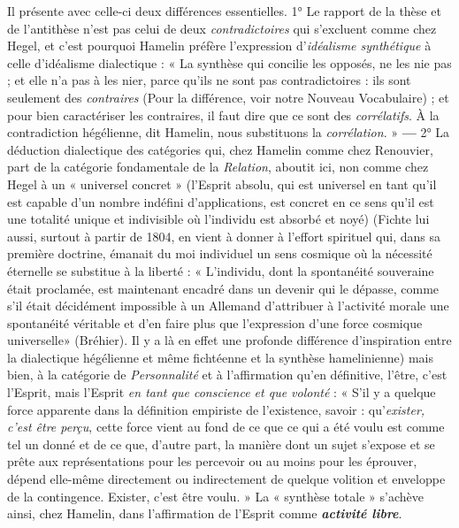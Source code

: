 Il présente avec celle-ci deux différences essentielles. 1° Le rapport de
la thèse et de l’antithèse n’est pas celui de deux {\it contradictoires} qui s’excluent
comme chez Hegel, et c’est pourquoi Hamelin préfère l’expression d'\textsf{\textit {idéalisme
synthétique}} à celle d’idéalisme dialectique : « La synthèse qui concilie
les opposés, ne les nie pas ; et elle n’a pas à les nier, parce qu’ils ne sont pas
contradictoires : ils sont seulement des {\it contraires} {\scriptsize (Pour la différence, voir notre Nouveau Vocabulaire)} ; et pour bien caractériser
les contraires, il faut dire que ce sont des {\it corrélatifs}. À la contradiction
hégélienne, dit Hamelin, nous substituons la {\it corrélation}. » {\bf —} 2° La déduction
dialectique des catégories qui, chez Hamelin comme chez Renouvier,
part de la catégorie fondamentale de la {\it Relation}, aboutit ici, non comme
chez Hegel à un « universel concret » (l'Esprit absolu, qui est universel en
tant qu’il est capable d’un nombre indéfini d'applications, est concret en
ce sens qu'il est une totalité unique et indivisible où l’individu est absorbé
et noyé)
{\scriptsize (Fichte lui aussi, surtout à partir de 1804, en vient à donner à l'effort spirituel qui,
dans sa première doctrine, émanait du moi individuel un sens cosmique où la nécessité
éternelle se substitue à la liberté : « L'individu, dont la spontanéité souveraine était
proclamée, est maintenant encadré dans un devenir qui le dépasse, comme s'il était
décidément impossible à un Allemand d’attribuer à l’activité morale une spontanéité
véritable et d'en faire plus que l'expression d’une force cosmique universelle» (Bréhier).
Il y a là en effet une profonde différence d'inspiration entre la dialectique hégélienne et
même fichtéenne et la synthèse hamelinienne)}
mais bien, à la catégorie de {\it Personnalité} et à l'affirmation qu’en
définitive, l'être, c’est l'Esprit, mais l'Esprit {\it en tant que conscience et que
volonté} : « S'il y a quelque force apparente dans la définition empiriste de
l'existence, savoir : qu’{\it exister, c’est être perçu}, cette force vient au fond de
ce que ce qui a été voulu est comme tel un donné et de ce que, d'autre
part, la manière dont un sujet s'expose et se prête aux représentations pour
les percevoir ou au moins pour les éprouver, dépend elle-même directement
ou indirectement de quelque volition et enveloppe de la contingence.
Exister, c’est être voulu. »
La « synthèse totale » s’achève ainsi, chez Hamelin, dans l’affirmation
de l'Esprit comme \textbf{\textit {activité libre}}.


